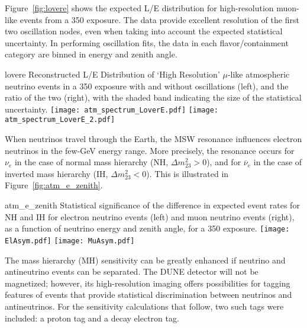 Figure~\ref{fig:lovere} shows the expected L/E distribution for high-resolution muon-like 
events from a \SI{350}{\ktyr} exposure. The data provide excellent resolution of the 
first two oscillation nodes, even when taking into account the expected statistical uncertainty.
In performing oscillation fits, the data in each flavor/containment category are 
binned in energy and zenith angle. 

\begin{cdrfigure}{lovere}
{Reconstructed L/E Distribution of `High Resolution'
$\mu$-like atmospheric neutrino events in a \SI{350}{\ktyr} exposure with and
without oscillations (left), and the ratio of the two (right), with the
shaded band indicating the size of the statistical uncertainty.}
\texttt{[image: atm\_spectrum\_LoverE.pdf]}
\texttt{[image: atm\_spectrum\_LoverE\_2.pdf]}
\end{cdrfigure}

When neutrinos travel through the Earth, the MSW resonance influences 
electron neutrinos in the few-GeV energy range. More precisely, the resonance 
occurs for $\nu_e$ in the case of normal mass hierarchy (NH, $\Delta m^2_{23} > 0$), and for 
$\overline{\nu}_e$ in the case of inverted mass hierarchy (IH, $\Delta m^2_{23} < 0$). This is 
illustrated in Figure~\ref{fig:atm_e_zenith}. 

\begin{cdrfigure}{atm_e_zenith}
{Statistical significance of the difference in expected event rates for NH and IH for 
electron neutrino events (left) and muon neutrino events (right), as a function of neutrino
energy and zenith angle, for a \SI{350}{\ktyr} exposure.}
\texttt{[image: ElAsym.pdf]}
\texttt{[image: MuAsym.pdf]}
\end{cdrfigure}

The mass hierarchy (MH) sensitivity can be greatly enhanced if neutrino and antineutrino events can be 
separated. The DUNE detector will not be magnetized; however, its high-resolution 
imaging offers possibilities for tagging features of events that provide statistical 
discrimination between neutrinos and antineutrinos. For the sensitivity calculations 
that follow, two such tags were included: a proton tag and a decay electron tag. 

